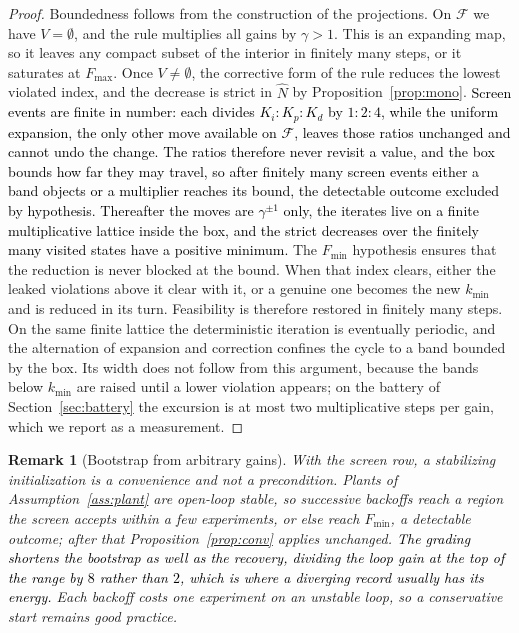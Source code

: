\documentclass[final,3p,times,twocolumn]{elsarticle}
\newcommand{\rev}[1]{#1}   %
\newcommand{\fix}[1]{#1}  %
\newcommand{\new}[1]{\textcolor{black}{#1}}  %
\newtheorem{remark}{Remark}
\begin{document}
\begin{proof}
Boundedness follows from the construction of the projections. On
$\mathcal F$ we have $V = \emptyset$, and the rule multiplies all gains
by $\gamma > 1$. This is an expanding map, so it leaves any compact
subset of the interior in finitely many steps, or it saturates at
$F_{\max}$. Once $V \ne \emptyset$, the corrective form of the rule
reduces the lowest violated index, and the decrease is strict \fix{in
$\hat N$} by Proposition~\ref{prop:mono}. \new{Screen events are finite
in number: each divides $K_i \!:\! K_p \!:\! K_d$ by
$1 \!:\! 2 \!:\! 4$, while the uniform expansion, the only other move
available on $\mathcal F$, leaves those ratios unchanged and cannot undo
the change. The ratios therefore never revisit a value, and the box
bounds how far they may travel, so after finitely many screen events
either a band objects or a multiplier reaches its bound, the detectable
outcome excluded by hypothesis. Thereafter the moves are
$\gamma^{\pm1}$ only, the iterates live on a finite multiplicative
lattice inside the box, and the strict decreases over the finitely many
visited states have a positive minimum.} The $F_{\min}$ hypothesis
ensures that the reduction is never blocked at the bound. When that
index clears, either the leaked violations above it clear with it, or a
genuine one becomes the new $k_{\min}$ and is reduced in its turn.
Feasibility is therefore restored in finitely many steps. \rev{On the
same finite lattice the deterministic iteration is eventually
periodic,} and the alternation of expansion and correction confines the
\rev{cycle} to \fix{a band bounded by the box. Its width does not
follow from this argument, because the bands below $k_{\min}$ are raised
until a lower violation appears; on the battery of
Section~\ref{sec:battery} the excursion is at most two multiplicative
steps per gain, which we report as a measurement}.
\end{proof}


\begin{remark}[Bootstrap from arbitrary gains]\label{rem:bootstrap}
With the screen row, a stabilizing initialization is a convenience and
not a precondition. Plants of Assumption~\ref{ass:plant} are open-loop
stable, so successive backoffs reach a region the screen accepts within
a few experiments, or else reach $F_{\min}$, a detectable outcome;
after that Proposition~\ref{prop:conv} applies unchanged. \new{The
grading shortens the bootstrap as well as the recovery, dividing the
loop gain at the top of the range by $8$ rather than $2$, which is
where a diverging record usually has its energy.} Each backoff costs
one experiment on an unstable loop, so a conservative start remains
good practice.
\end{remark}
\end{document}
